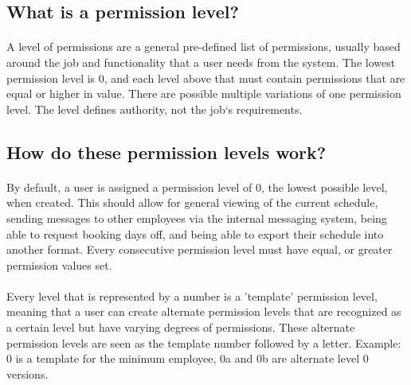 \documentclass[letterpaper,12pt]{report}
\begin{document}
\subsection*{What is a permission level?}
\paragraph*{}\hspace{0.6cm}A level of permissions are a general pre-defined list of permissions, usually based around the job and functionality that a user needs from the system. The lowest permission level is 0, and each level above that must contain permissions that are equal or higher in value. There are possible multiple variations of one permission level. The level defines authority, not the job`s requirements.
\pagebreak
\subsection*{How do these permission levels work?}
\paragraph*{}\hspace{0.6cm}By default, a user is assigned a permission level of 0, the lowest possible level, when created. This should allow for general viewing of the current schedule, sending messages to other employees via the internal messaging system, being able to request booking days off, and being able to export their schedule into another format. Every consecutive permission level must have equal, or greater permission values set.
\paragraph*{}\hspace{0.6cm}Every level that is represented by a number is a 'template' permission level,  meaning that a user can create alternate permission levels that are recognized as a certain level but have varying degrees of permissions. These alternate permission levels are seen as the template number followed by a letter.\newline
\newline
	\hspace*{0.8cm} Example: 0 is a template for the minimum employee, 0a and 0b are alternate level 0 versions.\newline
\newline
\end{document}
